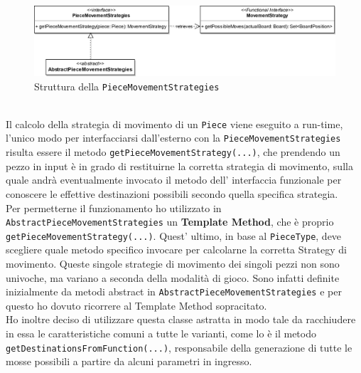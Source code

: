 \documentclass[a4paper,12pt]{report}
\begin{document}
\begin{figure}[H]
    \begin{center}
        \centering
        \includegraphics[scale=0.8]{img/Stefano/PieceMovementStrategies.png}
    \end{center}
    \caption{Struttura della \texttt{PieceMovementStrategies}}
    \label{img:PieceMovementStrategies}
\end{figure}
\
\\
%
Il calcolo della strategia di movimento di un \texttt{Piece} viene eseguito a run-time, l'unico modo per interfacciarsi dall'esterno con la \texttt{PieceMovementStrategies} risulta essere il metodo \texttt{getPieceMovementStrategy(...)}, che prendendo un pezzo in input è in grado di restituirne la corretta strategia di movimento, sulla quale andrà eventualmente invocato il metodo dell' interfaccia funzionale per conoscere le effettive destinazioni possibili secondo quella specifica strategia.
% 
\\
Per permetterne il funzionamento ho utilizzato in \texttt{AbstractPieceMovementStrategies} un \textbf{Template Method}, che è proprio \texttt{getPieceMovementStrategy(...)}. Quest' ultimo, in base al \texttt{PieceType}, deve scegliere quale metodo specifico invocare per calcolarne la corretta Strategy di movimento. Queste singole strategie di movimento dei singoli pezzi non sono univoche, ma variano a seconda della modalità di gioco. Sono infatti definite inizialmente da metodi abstract in \texttt{AbstractPieceMovementStrategies} e per questo ho dovuto ricorrere al Template Method sopracitato. 
\\
Ho inoltre deciso di utilizzare questa classe astratta in modo tale da racchiudere in essa le caratteristiche comuni a tutte le varianti, come lo è il metodo \texttt{getDestinationsFromFunction(...)}, responsabile della generazione di tutte le mosse possibili a partire da alcuni parametri in ingresso.
\end{document}
